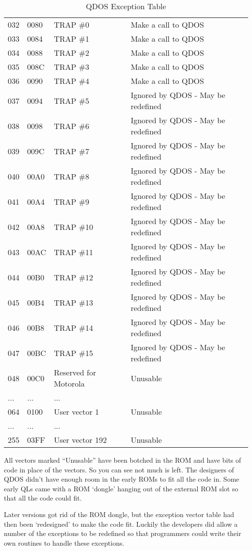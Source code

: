 \begin{table}[htbp]
\begin{tabular}{l l l l}
032 & 0080 & TRAP \#0 & Make a call to QDOS \\
033 & 0084 & TRAP \#1 & Make a call to QDOS \\
034 & 0088 & TRAP \#2 & Make a call to QDOS \\
035 & 008C & TRAP \#3 & Make a call to QDOS \\
036 & 0090 & TRAP \#4 & Make a call to QDOS \\
037 & 0094 & TRAP \#5 & Ignored by QDOS -{} May be redefined \\
038 & 0098 & TRAP \#6 & Ignored by QDOS -{} May be redefined \\
039 & 009C & TRAP \#7 & Ignored by QDOS -{} May be redefined \\
040 & 00A0 & TRAP \#8 & Ignored by QDOS -{} May be redefined \\
041 & 00A4 & TRAP \#9 & Ignored by QDOS -{} May be redefined \\
042 & 00A8 & TRAP \#10 & Ignored by QDOS -{} May be redefined \\
043 & 00AC & TRAP \#11 & Ignored by QDOS -{} May be redefined \\
044 & 00B0 & TRAP \#12 & Ignored by QDOS -{} May be redefined \\
045 & 00B4 & TRAP \#13 & Ignored by QDOS -{} May be redefined \\
046 & 00B8 & TRAP \#14 & Ignored by QDOS -{} May be redefined \\
047 & 00BC & TRAP \#15 & Ignored by QDOS -{} May be redefined \\
048 & 00C0 & Reserved for Motorola & Unusable \\
... & ... & ... & {}\\
064 & 0100 & User vector 1 & Unusable \\
... & ... & ... & {}\\
255 & 03FF & User vector 192 & Unusable \\
%
\bottomrule
\end{tabular}
\caption{QDOS Exception Table}
\label{tab:QDOSExceptionTable}
\end{table}

\begin{note}
All vectors marked ``Unusable'' have been botched in the ROM and
      have bits of code in place of the vectors. So you can see not much is
      left. The designers of QDOS didn't have enough room in the early ROMs to
      fit all the code in. Some early QLs came with a ROM `dongle' hanging out of
      the external ROM slot so that all the code could fit. 

Later versions got rid of the ROM dongle, but the exception vector table had then been
      `redesigned' to make the code fit. Luckily the developers did allow a number of
      the exceptions to be redefined so that programmers could write their own
      routines to handle these exceptions.
\end{note}

